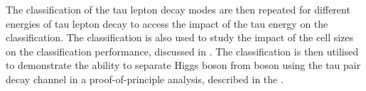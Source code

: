 The classification of the tau lepton decay modes are then  repeated for different energies of tau lepton decay to access the impact of the tau energy on the classification. The classification is also used to study the impact of the \ECAL cell sizes on the classification performance,  discussed in . The classification is then utilised to demonstrate the ability to separate Higgs boson from \PZ  boson using the tau pair decay channel in a proof-of-principle analysis, described in the .







